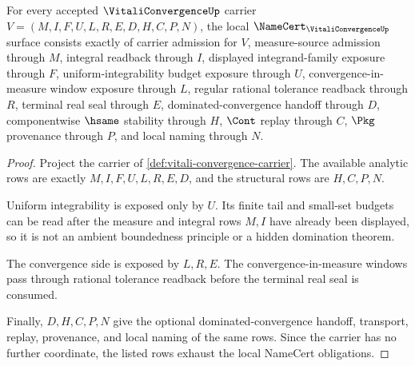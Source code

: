 \begin{theorem}
\label{thm:vitali-convergence-namecert-obligations}
For every accepted $\VitaliConvergenceUp$ carrier $V=(M,I,F,U,L,R,E,D,H,C,P,N)$, the local $\NameCert_{\VitaliConvergenceUp}$ surface consists exactly of carrier admission for $V$, measure-source admission through $M$, integral readback through $I$, displayed integrand-family exposure through $F$, uniform-integrability budget exposure through $U$, convergence-in-measure window exposure through $L$, regular rational tolerance readback through $R$, terminal real seal through $E$, dominated-convergence handoff through $D$, componentwise $\hsame$ stability through $H$, $\Cont$ replay through $C$, $\Pkg$ provenance through $P$, and local naming through $N$.
\end{theorem}
\begin{proof}
Project the carrier of \autoref{def:vitali-convergence-carrier}. The available analytic rows are exactly $M,I,F,U,L,R,E,D$, and the structural rows are $H,C,P,N$.

Uniform integrability is exposed only by $U$. Its finite tail and small-set budgets can be read after the measure and integral rows $M,I$ have already been displayed, so it is not an ambient boundedness principle or a hidden domination theorem.

The convergence side is exposed by $L,R,E$. The convergence-in-measure windows pass through rational tolerance readback before the terminal real seal is consumed.

Finally, $D,H,C,P,N$ give the optional dominated-convergence handoff, transport, replay, provenance, and local naming of the same rows. Since the carrier has no further coordinate, the listed rows exhaust the local NameCert obligations.
\end{proof}

